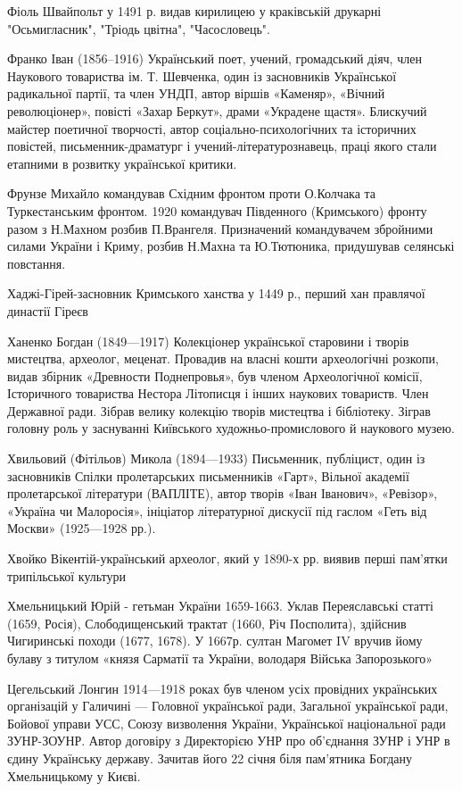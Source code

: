 Фіоль Швайпольт у 1491 р. видав кирилицею у краківській друкарні "Осьмигласник", "Тріодь цвітна", "Часословець".

Франко Іван (1856–1916) Український поет, учений, громадський діяч, член Наукового товариства ім. Т. Шевченка, один із засновників Української радикальної партії, та член УНДП, автор віршів «Каменяр», «Вічний революціонер», повісті «Захар Беркут», драми «Украдене щастя». Блискучий майстер поетичної творчості, автор соціально-психологічних та історичних повістей, письменник-драматург і учений-літературознавець, праці якого стали етапними в розвитку української критики.

Фрунзе Михайло командував Східним фронтом проти О.Колчака та Туркестанським фронтом. 1920 командувач Південного (Кримського) фронту разом з Н.Махном розбив П.Врангеля.    Призначений командувачем збройними силами України і Криму, розбив Н.Махна та Ю.Тютюника, придушував селянські повстання. 

Хаджі-Гірей-засновник Кримського ханства у 1449 р., перший хан правлячої династії Гіреєв

Ханенко Богдан (1849—1917) Колекціонер української старовини і творів мистецтва, археолог, меценат. Провадив на власні кошти археологічні розкопи, видав збірник «Древности Поднепровья», був членом Археологічної комісії, Історичного товариства Нестора Літописця і інших наукових товариств. Член Державної ради. Зібрав велику колекцію творів мистецтва і бібліотеку. Зіграв головну роль у заснуванні Київського художньо-промислового й наукового музею.

Хвильовий (Фітільов) Микола (1894—1933) Письменник, публіцист, один із засновників Спілки пролетарських письменників «Гарт», Вільної академії пролетарської літератури (ВАПЛІТЕ), автор творів «Іван Іванович», «Ревізор», «Україна чи Малоросія», ініціатор літературної дискусії під гаслом «Геть від Москви» (1925—1928 рр.).

Хвойко Вікентій-український археолог, який у 1890-х рр. виявив перші пам’ятки трипільської культури

Хмельницький Юрій  - гетьман України 1659-1663. Уклав Переяславські статті (1659, Росія), Слободищенський трактат (1660, Річ Посполита), здійснив Чигиринські походи (1677, 1678). У 1667р. султан Магомет IV вручив йому булаву з титулом «князя Сарматії та України, володаря Війська Запорозького»

Цегельський Лонгин  1914—1918 роках був членом усіх провідних українських організацій у Галичині — Головної української ради, Загальної української ради, Бойової управи УСС, Союзу визволення України,  Української національної ради ЗУНР-ЗОУНР. Автор договіру з Директорією УНР про об'єднання ЗУНР і УНР в єдину Українську державу. Зачитав його 22 січня біля пам'ятника Богдану Хмельницькому у Києві.


